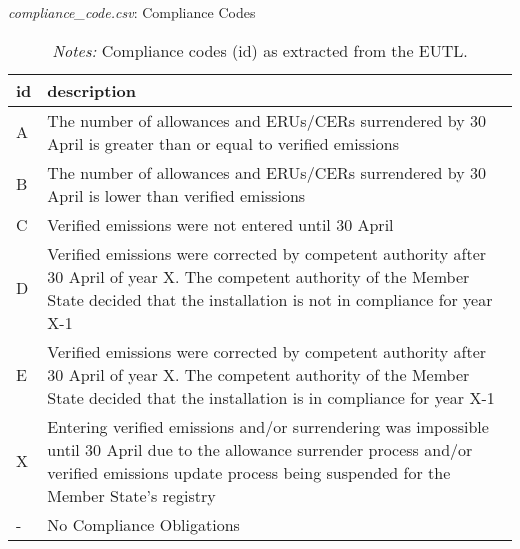 \documentclass[authoryear]{elsarticle}
\begin{document}
\begin{table}[htbp]\scriptsize
	\caption{\textit{compliance\_code.csv}: Compliance Codes}\label{tab:complianceCode}
	\centering
	\begin{tabular*}{\textwidth}{@{}@{\extracolsep{\fill}} lp{10cm} @{}}
		\toprule
		\toprule
		\textbf{id} & \textbf{description} \\
		\midrule
		A     & The number of allowances and ERUs/CERs surrendered by 30 April is greater than or equal to verified emissions \\
		B     & The number of allowances and ERUs/CERs surrendered by 30 April is lower than verified emissions \\
		C     & Verified emissions were not entered until 30 April \\
		D     & Verified emissions were corrected by competent authority after 30 April of year X. The competent authority of the Member State decided that the installation is not in compliance for year X-1 \\
		E     & Verified emissions were corrected by competent authority after 30 April of year X. The competent authority of the Member State decided that the installation is in compliance for year X-1 \\
		X     & Entering verified emissions and/or surrendering was impossible until 30 April due to the allowance surrender process and/or verified emissions update process being suspended for the Member State's registry \\
		-     & No Compliance Obligations \\
		\bottomrule
		\bottomrule
	\end{tabular*}%
	\vspace{-3ex}
	\caption*{\footnotesize \emph{Notes:} Compliance codes (id) as extracted from the EUTL.}
	\vspace{0ex}
\end{table}%
\end{document}
